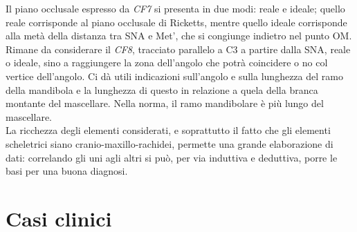 Il piano occlusale espresso da \emph{CF7} si presenta in due modi: reale e ideale; quello reale corrisponde al piano occlusale di Ricketts, mentre quello ideale corrisponde alla metà della distanza tra SNA e Met', che si congiunge indietro nel punto OM.\\

Rimane da considerare il \emph{CF8}, tracciato parallelo a C3 a partire dalla SNA, reale o ideale, sino a raggiungere la zona dell'angolo che potrà coincidere o no col vertice dell'angolo. Ci dà utili indicazioni sull'angolo e sulla lunghezza del ramo della mandibola e la lunghezza di questo in relazione a quela della branca montante del mascellare. Nella norma, il ramo mandibolare è più lungo del mascellare.\\

La ricchezza degli elementi considerati, e soprattutto il fatto che gli elementi scheletrici siano cranio-maxillo-rachidei, permette una grande elaborazione di dati: correlando gli uni agli altri si può, per via induttiva e deduttiva, porre le basi per una buona diagnosi.

\section{Casi clinici}